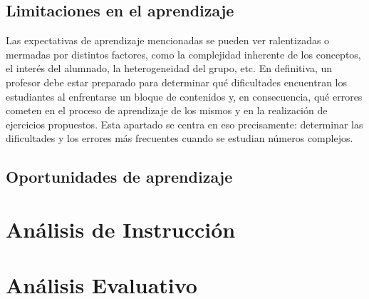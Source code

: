\documentclass[../main.tex]{memoir}
\begin{document}
\subsection{Limitaciones en el aprendizaje}

Las expectativas de aprendizaje mencionadas se pueden ver ralentizadas o mermadas por distintos factores, como la complejidad inherente de los conceptos, el interés del alumnado, la heterogeneidad del grupo, etc. En definitiva, un profesor debe estar preparado para determinar qué dificultades encuentran los estudiantes al enfrentarse un bloque de contenidos y, en consecuencia, qué errores cometen en el proceso de aprendizaje de los mismos y en la realización de ejercicios propuestos. Esta apartado se centra en eso precisamente: determinar las dificultades y los errores más frecuentes cuando se estudian números complejos.


\subsection{Oportunidades de aprendizaje}

\section{Análisis de Instrucción}



\section{Análisis Evaluativo}
\end{document}
